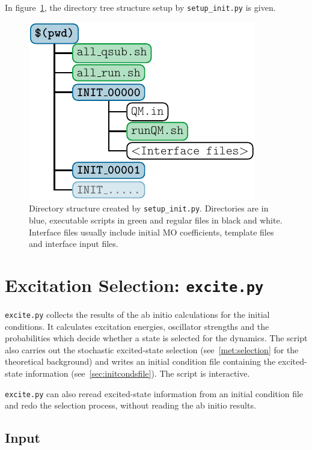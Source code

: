 \documentclass[a4paper,11pt,DIV=15,openany,twoside=false]{scrbook}
\newcommand{\ttt}[1]{\texttt{#1}}
\begin{document}
In figure~\ref{fig:dirs_init}, the directory tree structure setup by \ttt{setup\_init.py} is given.

\begin{figure}
  \centering
  \includegraphics[scale=1]{img/dirs_init/dirs_init.pdf}
  \caption{Directory structure created by \ttt{setup\_init.py}. Directories are in blue, executable scripts in green and regular files in black and white. Interface files usually include initial MO coefficients, template files and interface input files.}
  \label{fig:dirs_init}
\end{figure}




\section{Excitation Selection: \ttt{excite.py}}\label{sec:excite.py}

\ttt{excite.py} collects the results of the ab initio calculations for the initial conditions. It calculates excitation energies, oscillator strengths and the probabilities which decide whether a state is selected for the dynamics. The script also carries out the stochastic excited-state selection (see~\ref{met:selection} for the theoretical background) and writes an initial condition file containing the excited-state information (see~\ref{sec:initcondsfile}). The script is interactive.

\ttt{excite.py} can also reread excited-state information from an initial condition file and redo the selection process, without reading the ab initio results.

\subsection{Input}
\end{document}
